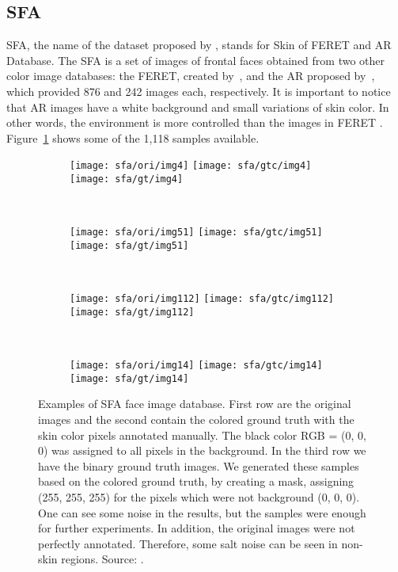 \subsection{SFA}
\label{sec:datasets_sfa}
SFA, the name of the dataset proposed by \citet{sfa-skin-dataset:13}, stands for Skin of FERET and AR Database. The SFA is a set of images of frontal faces obtained from two other color image databases: the FERET, created by~\citet{feret:96}, and the AR proposed by~\citet{ar-face-database:98}, which provided 876 and 242 images each, respectively. It is important to notice that AR images have a white background and small variations of skin color. In other words, the environment is more controlled than the images in FERET \cite{sfa-skin-dataset:13}. Figure~\ref{fig:sfa_dataset_exemplo} shows some of the 1,118 samples available.

\begin{figure}[ht]
    \centering
    \begin{subfigure}[t]{0.21\textwidth}
        \texttt{[image: sfa/ori/img4]}
        \texttt{[image: sfa/gtc/img4]}
        \texttt{[image: sfa/gt/img4]}
    \end{subfigure}
    ~
    \begin{subfigure}[t]{0.21\textwidth}
        \texttt{[image: sfa/ori/img51]}
        \texttt{[image: sfa/gtc/img51]}
        \texttt{[image: sfa/gt/img51]}
    \end{subfigure}
    ~
    \begin{subfigure}[t]{0.21\textwidth}
        \texttt{[image: sfa/ori/img112]}
        \texttt{[image: sfa/gtc/img112]}
        \texttt{[image: sfa/gt/img112]}
    \end{subfigure}
    ~ %
    \begin{subfigure}[t]{0.21\textwidth}
        \texttt{[image: sfa/ori/img14]}
        \texttt{[image: sfa/gtc/img14]}
        \texttt{[image: sfa/gt/img14]}
    \end{subfigure}
    \caption[Examples of SFA face image database]{Examples of SFA face image database. First row are the original images and the second contain the colored ground truth with the skin color pixels annotated manually. The black color RGB = (0, 0, 0) was assigned to all pixels in the background. In the third row we have the binary ground truth images. We generated these samples based on the colored ground truth, by creating a mask, assigning (255, 255, 255) for the pixels which were not background (0, 0, 0). One can see some noise in the results, but the samples were enough for further experiments. In addition, the original images were not perfectly annotated. Therefore, some salt noise can be seen in non-skin regions. Source: \citet{sfa-skin-dataset:13}.}
    \label{fig:sfa_dataset_exemplo}
\end{figure}

